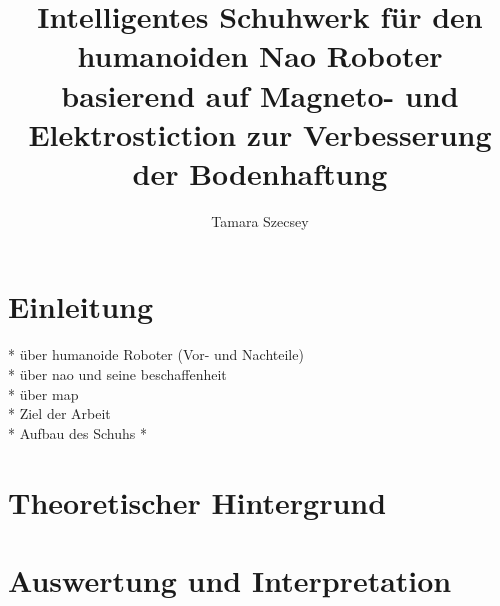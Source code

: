 \documentclass[a4paper,
DIV=13,
12pt,
BCOR=10mm,
department=FakEI,
oneside,
parskip=half,
automark,
]{OTHRartcl}
\title{Intelligentes Schuhwerk für den humanoiden Nao Roboter basierend auf Magneto- und Elektrostiction zur Verbesserung der Bodenhaftung}
\author{Tamara Szecsey}
\begin{document}
\maketitle
\makedeclaration

\thispagestyle{empty}
\tableofcontents	
\clearpage	
\setcounter{page}{1}

\section{Einleitung}
* über humanoide Roboter (Vor- und Nachteile) \\
* über nao und seine beschaffenheit \\
* über map \\
* Ziel der Arbeit \\

* Aufbau des Schuhs
* 
\newpage
\section{Theoretischer Hintergrund}

%
%
%
%
%
\newpage
\section{Auswertung und Interpretation}

%
%
%
%

\FloatBarrier
\newpage
\clearpage	
\thispagestyle{empty}
\printbibliography
\end{document}
